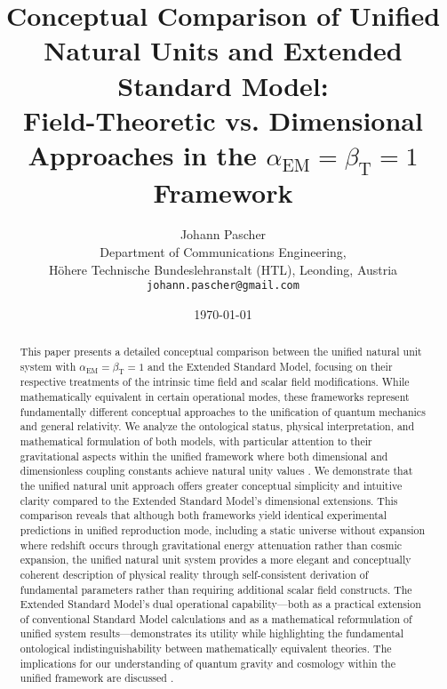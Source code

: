 \documentclass[12pt,a4paper]{article}
\newcommand{\alphaEM}{\alpha_{\text{EM}}}
\newcommand{\betaT}{\beta_{\text{T}}}
\begin{document}
	
	\title{Conceptual Comparison of Unified Natural Units and Extended Standard Model: \\
		Field-Theoretic vs. Dimensional Approaches in the $\alphaEM = \betaT = 1$ Framework}
	\author{Johann Pascher\\
		Department of Communications Engineering, \\Höhere Technische Bundeslehranstalt (HTL), Leonding, Austria\\
		\texttt{johann.pascher@gmail.com}}
	\date{\today}
	
	\maketitle
	
	\begin{abstract}
		This paper presents a detailed conceptual comparison between the unified natural unit system with $\alphaEM = \betaT = 1$ and the Extended Standard Model, focusing on their respective treatments of the intrinsic time field and scalar field modifications. While mathematically equivalent in certain operational modes, these frameworks represent fundamentally different conceptual approaches to the unification of quantum mechanics and general relativity. We analyze the ontological status, physical interpretation, and mathematical formulation of both models, with particular attention to their gravitational aspects within the unified framework where both dimensional and dimensionless coupling constants achieve natural unity values \cite{pascher_unified_2025}. We demonstrate that the unified natural unit approach offers greater conceptual simplicity and intuitive clarity compared to the Extended Standard Model's dimensional extensions. This comparison reveals that although both frameworks yield identical experimental predictions in unified reproduction mode, including a static universe without expansion where redshift occurs through gravitational energy attenuation rather than cosmic expansion, the unified natural unit system provides a more elegant and conceptually coherent description of physical reality through self-consistent derivation of fundamental parameters rather than requiring additional scalar field constructs. The Extended Standard Model's dual operational capability—both as a practical extension of conventional Standard Model calculations and as a mathematical reformulation of unified system results—demonstrates its utility while highlighting the fundamental ontological indistinguishability between mathematically equivalent theories. The implications for our understanding of quantum gravity and cosmology within the unified framework are discussed \cite{pascher_lagrangian_2025,pascher_beta_derivation_2025}.
	\end{abstract}
	\newpage
	\tableofcontents
	\newpage
	
\end{document}
